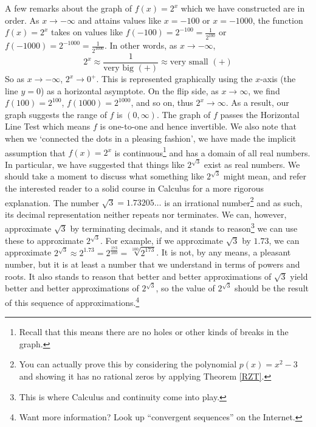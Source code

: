 A few remarks about the graph of $f(x) = 2^{x}$ which we have constructed are in order.  As $x \rightarrow -\infty$ and attains values like $x = -100$ or $x=-1000$, the function $f(x) = 2^{x}$ takes on values like $f(-100) = 2^{-100} = \frac{1}{2^{100}}$ or $f(-1000) = 2^{-1000} = \frac{1}{2^{1000}}$.  In other words, as $x \rightarrow -\infty$, \[2^{x} \approx \frac{1}{\mbox{very big $(+)$}}  \approx \mbox{very small $(+)$}\]  So as $x \rightarrow -\infty$, $2^{x} \rightarrow 0^{+}$.  This is represented graphically using the $x$-axis (the line $y = 0$) as a horizontal asymptote.  On the flip side, as $x \rightarrow \infty$, we find $f(100) = 2^{100}$, $f(1000) = 2^{1000}$, and so on, thus $2^{x} \rightarrow \infty$. As a result, our graph suggests the range of $f$ is $(0,\infty)$.  The graph of $f$ passes the Horizontal Line Test which means $f$ is one-to-one and hence invertible.  We also note that when we `connected the dots in a pleasing fashion', we have made the implicit assumption that $f(x) = 2^{x}$ is continuous\footnote{Recall that this means there are no holes or other kinds of breaks in the graph.} and has a domain of all real numbers.  In particular, we have suggested that things like $2^{\sqrt{3}}$ exist as real numbers.  We should take a moment to discuss what something like $2^{\sqrt{3}}$ might mean, and refer the interested reader to a solid course in Calculus for a more rigorous explanation.  The number $\sqrt{3} = 1.73205 \ldots$ is an irrational number\footnote{You can actually prove this by considering the polynomial $p(x) = x^2-3$ and showing it has no rational zeros by applying Theorem \ref{RZT}.} and as such, its decimal representation neither repeats nor terminates.  We can, however, approximate $\sqrt{3}$ by terminating decimals, and it stands to reason\footnote{This is where Calculus and continuity come into play.} we can use these to approximate $2^{\sqrt{3}}$.  For example, if we approximate $\sqrt{3}$ by $1.73$, we can approximate $2^{\sqrt{3}} \approx 2^{1.73} = 2^{\frac{173}{100}} = \sqrt[100]{2^{173}}$. It is not, by any means, a pleasant number, but it is at least a number that we understand in terms of powers and roots.  It also stands to reason that better and better approximations of $\sqrt{3}$ yield better and better approximations of $2^{\sqrt{3}}$, so the value of $2^{\sqrt{3}}$ should be the result of this sequence of approximations.\footnote{Want more information?  Look up ``convergent sequences'' on the Internet.}
  
\smallskip

